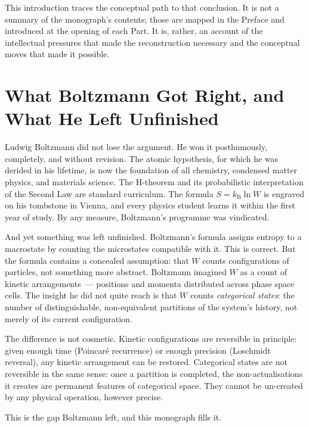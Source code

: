 This introduction traces the conceptual path to that conclusion. It is not a summary
of the monograph's contents; those are mapped in the Preface and introduced at the
opening of each Part. It is, rather, an account of the intellectual pressures that
made the reconstruction necessary and the conceptual moves that made it possible.


\section*{What Boltzmann Got Right, and What He Left Unfinished}

Ludwig Boltzmann did not lose the argument. He won it posthumously, completely, and
without revision. The atomic hypothesis, for which he was derided in his lifetime,
is now the foundation of all chemistry, condensed matter physics, and materials
science. The H-theorem and its probabilistic interpretation of the Second Law are
standard curriculum. The formula $S = k_{\mathrm{B}} \ln W$ is engraved on his
tombstone in Vienna, and every physics student learns it within the first year of
study. By any measure, Boltzmann's programme was vindicated.

And yet something was left unfinished. Boltzmann's formula assigns entropy to a
macrostate by counting the microstates compatible with it. This is correct.
But the formula contains a concealed assumption: that $W$ counts configurations
of particles, not something more abstract. Boltzmann imagined $W$ as a count of
kinetic arrangements~--- positions and momenta distributed across phase space cells.
The insight he did not quite reach is that $W$ counts \emph{categorical states}: the
number of distinguishable, non-equivalent partitions of the system's history, not
merely of its current configuration.

The difference is not cosmetic. Kinetic configurations are reversible in principle:
given enough time (Poincaré recurrence) or enough precision (Loschmidt reversal),
any kinetic arrangement can be restored. Categorical states are not reversible
in the same sense: once a partition is completed, the non-actualisations it creates
are permanent features of categorical space. They cannot be un-created by any
physical operation, however precise.

This is the gap Boltzmann left, and this monograph fills it.


